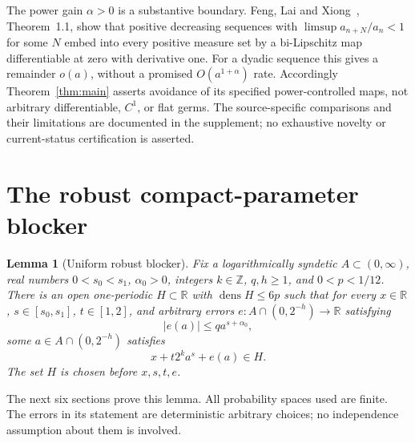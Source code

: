 \documentclass[11pt]{article}
\newtheorem{lemma}[theorem]{Lemma}
\theoremstyle{definition}
\theoremstyle{remark}
\newcommand{\R}{\mathbb R}
\newcommand{\Z}{\mathbb Z}
\newcommand{\dens}{\operatorname{dens}}
\begin{document}
The power gain $\alpha>0$ is a substantive boundary. Feng, Lai and
Xiong~\cite{FLX}, Theorem~1.1, show that positive decreasing sequences with
$\limsup a_{n+N}/a_n<1$ for some $N$ embed into every positive measure set by a
bi-Lipschitz map differentiable at zero with derivative one. For a dyadic
sequence this gives a remainder $o(a)$, without a promised $O(a^{1+\alpha})$
rate. Accordingly Theorem~\ref{thm:main} asserts avoidance of its specified
power-controlled maps, not arbitrary differentiable, $C^1$, or flat germs.
The source-specific comparisons and their limitations are documented in the
supplement; no exhaustive novelty or current-status certification is asserted.

\section{The robust compact-parameter blocker}\label{sec:sample}
\begin{lemma}[Uniform robust blocker]\label{lem:blocker}
Fix a logarithmically syndetic $A\subset(0,\infty)$, real numbers
$0<s_0<s_1$, $\alpha_0>0$, integers $k\in\Z$, $q,h\geq1$, and $0<p<1/12$.
There is an open one-periodic $H\subset\R$ with $\dens H\leq6p$ such that
for every $x\in\R$, $s\in[s_0,s_1]$, $t\in[1,2]$, and arbitrary errors
$e:A\cap(0,2^{-h})\to\R$ satisfying
\[
 |e(a)|\leq q a^{s+\alpha_0},
\]
some $a\in A\cap(0,2^{-h})$ satisfies
\begin{equation}\label{eq:hit}
 x+t2^k a^s+e(a)\in H.
\end{equation}
The set $H$ is chosen before $x,s,t,e$.
\end{lemma}
The next six sections prove this lemma. All probability spaces used are finite.
The errors in its statement are deterministic arbitrary choices; no independence
assumption about them is involved.
\end{document}
